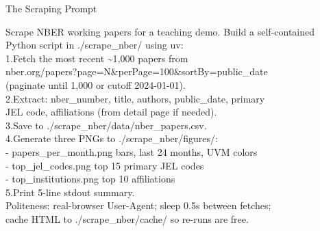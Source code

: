 \documentclass[aspectratio=169, 10pt]{beamer}
\begin{document}
\begin{frame}[fragile]{The Scraping Prompt}
\begin{tcolorbox}[promptboxsm]
{\color{white}\fontsize{5.5}{7}\selectfont\ttfamily
Scrape NBER working papers for a teaching demo. Build a self-contained\\
Python script in ./scrape\_nber/ using uv:\\[2pt]
1.\;Fetch the most recent \textasciitilde 1{,}000 papers from\\
\hspace*{1.5em}nber.org/papers?page=N\&perPage=100\&sortBy=public\_date\\
\hspace*{1.5em}(paginate until 1{,}000 or cutoff 2024-01-01).\\
2.\;Extract: nber\_number, title, authors, public\_date, primary\\
\hspace*{1.5em}JEL code, affiliations (from detail page if needed).\\
3.\;Save to ./scrape\_nber/data/nber\_papers.csv.\\
4.\;Generate three PNGs to ./scrape\_nber/figures/:\\
\hspace*{1.5em}- papers\_per\_month.png \quad bars, last 24 months, UVM colors\\
\hspace*{1.5em}- top\_jel\_codes.png \quad top 15 primary JEL codes\\
\hspace*{1.5em}- top\_institutions.png \quad top 10 affiliations\\
5.\;Print 5-line stdout summary.\\[2pt]
Politeness: real-browser User-Agent; sleep 0.5s between fetches;\\
cache HTML to ./scrape\_nber/cache/ so re-runs are free.
}
\end{tcolorbox}
\end{frame}
\end{document}
